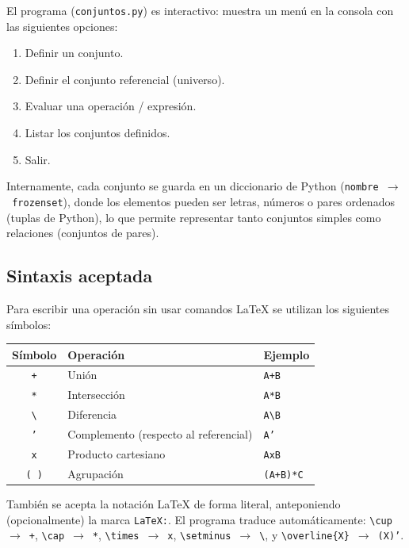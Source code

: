 \documentclass[11pt]{article}
\begin{document}
El programa (\texttt{conjuntos.py}) es interactivo: muestra un menú en la consola con
las siguientes opciones:

\begin{enumerate}
  \item Definir un conjunto.
  \item Definir el conjunto referencial (universo).
  \item Evaluar una operación / expresión.
  \item Listar los conjuntos definidos.
  \item Salir.
\end{enumerate}

Internamente, cada conjunto se guarda en un diccionario de Python
(\texttt{nombre~$\rightarrow$~frozenset}), donde los elementos pueden ser letras,
números o pares ordenados (tuplas de Python), lo que permite representar tanto
conjuntos simples como relaciones (conjuntos de pares).

\subsection{Sintaxis aceptada}
\label{sec:sintaxis}

Para escribir una operación sin usar comandos LaTeX se utilizan los siguientes
símbolos:

\begin{center}
\begin{tabular}{|c|l|l|}
\hline
\textbf{Símbolo} & \textbf{Operación} & \textbf{Ejemplo} \\
\hline
\texttt{+} & Unión & \texttt{A+B} \\
\texttt{*} & Intersección & \texttt{A*B} \\
\texttt{\textbackslash} & Diferencia & \texttt{A\textbackslash B} \\
\texttt{'} & Complemento (respecto al referencial) & \texttt{A'} \\
\texttt{x} & Producto cartesiano & \texttt{AxB} \\
\texttt{( )} & Agrupación & \texttt{(A+B)*C} \\
\hline
\end{tabular}
\end{center}

También se acepta la notación LaTeX de forma literal, anteponiendo (opcionalmente) la
marca \texttt{LaTeX:}. El programa traduce automáticamente:
\texttt{\textbackslash cup}~$\to$~\texttt{+},
\texttt{\textbackslash cap}~$\to$~\texttt{*},
\texttt{\textbackslash times}~$\to$~\texttt{x},
\texttt{\textbackslash setminus}~$\to$~\texttt{\textbackslash}, y
\texttt{\textbackslash overline\{X\}}~$\to$~\texttt{(X)'}.
\end{document}
